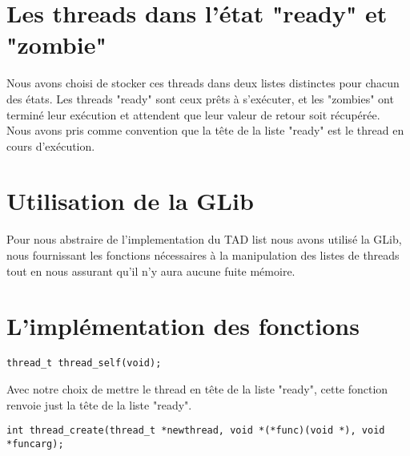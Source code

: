 \documentclass[12pt]{article}
\begin{document}
\section {Les threads dans l'état "ready" et "zombie"}

Nous avons choisi de stocker ces threads dans deux listes distinctes
pour chacun des états. Les threads "ready" sont ceux prêts à
s'exécuter, et les "zombies" ont terminé leur exécution et attendent
que leur valeur de retour soit récupérée.\\
Nous avons pris comme convention que la tête de la liste "ready" est
le thread en cours d'exécution.

\section {Utilisation de la GLib}

Pour nous abstraire de l'implementation du TAD list nous avons utilisé
la GLib, nous fournissant les fonctions nécessaires à la manipulation
des listes de threads tout en nous assurant qu'il n'y aura aucune
fuite mémoire.

\section {L'implémentation des fonctions}

\begin{verbatim}
thread_t thread_self(void);
\end{verbatim}
Avec notre choix de mettre le thread en tête de la liste "ready", 
cette fonction renvoie just la tête de la liste "ready".
~~\\
\begin{verbatim}
int thread_create(thread_t *newthread, void *(*func)(void *), void *funcarg);
\end{verbatim}
\end{document}
